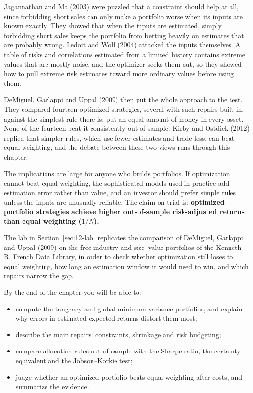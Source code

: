 Jagannathan and Ma (2003) were puzzled that a constraint should help at all, since forbidding short sales can only make a portfolio worse when its inputs are known exactly. They showed that when the inputs are estimated, simply forbidding short sales keeps the portfolio from betting heavily on estimates that are probably wrong. Ledoit and Wolf (2004) attacked the inputs themselves. A table of risks and correlations estimated from a limited history contains extreme values that are mostly noise, and the optimizer seeks them out, so they showed how to pull extreme risk estimates toward more ordinary values before using them. 

DeMiguel, Garlappi and Uppal (2009) then put the whole approach to the test. They compared fourteen optimized strategies, several with such repairs built in, against the simplest rule there is: put an equal amount of money in every asset. None of the fourteen beat it consistently out of sample. Kirby and Ostdiek (2012) replied that simpler rules, which use fewer estimates and trade less, can beat equal weighting, and the debate between these two views runs through this chapter.

The implications are large for anyone who builds portfolios. If optimization cannot beat equal weighting, the sophisticated models used in practice add estimation error rather than value, and an investor should prefer simple rules unless the inputs are unusually reliable. The claim on trial is: \textbf{optimized portfolio strategies achieve higher out-of-sample risk-adjusted returns than equal weighting ($1/N$).}

The lab in Section~\ref{sec:12-lab} replicates the comparison of DeMiguel, Garlappi and Uppal (2009) on the free industry and size--value portfolios of the Kenneth R. French Data Library, in order to check whether optimization still loses to equal weighting, how long an estimation window it would need to win, and which repairs narrow the gap.

By the end of the chapter you will be able to:

\begin{itemize}
  \item compute the tangency and global minimum-variance portfolios, and explain why errors in estimated expected returns distort them most;
  \item describe the main repairs: constraints, shrinkage and risk budgeting;
  \item compare allocation rules out of sample with the Sharpe ratio, the certainty equivalent and the Jobson--Korkie test;
  \item judge whether an optimized portfolio beats equal weighting after costs, and summarize the evidence.
\end{itemize}

